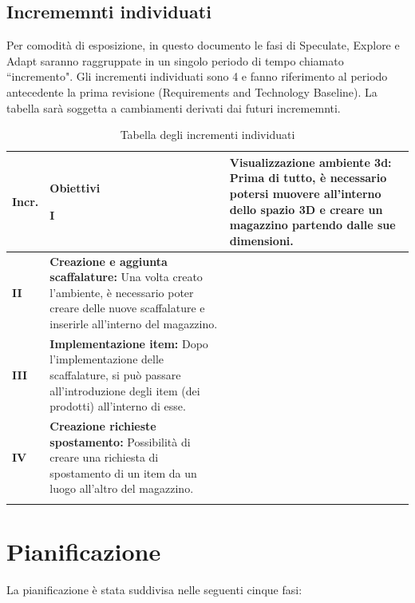 \subsection{Incrememnti individuati}\label{sec:modello_sviluppo:incrementi}
Per comodità di esposizione, in questo documento le fasi di Speculate, Explore e Adapt saranno raggruppate in un singolo periodo di tempo chiamato ``incremento".
Gli incrementi individuati sono 4 e fanno riferimento al periodo antecedente la prima revisione (Requirements and Technology Baseline).
La tabella sarà soggetta a cambiamenti derivati dai futuri incrememnti.
\begin{xltabular}{\textwidth}{p{0.05\textwidth} | p{0.5\textwidth} }

    \textbf{\color{white} Incr.} & \textbf{\color{white} Obiettivi} \ 
    \hline
    \endhead
    
    \textbf{I} 
    & \textbf{Visualizzazione ambiente 3d:} Prima di tutto, è necessario potersi muovere all'interno dello spazio 3D e creare un magazzino partendo dalle sue dimensioni. \\
    \hline

    \textbf{II} 
    & \textbf{Creazione e aggiunta scaffalature:} Una volta creato l'ambiente, è necessario poter creare delle nuove scaffalature e inserirle all'interno del magazzino. \\
    \hline

    \textbf{III} 
    & \textbf{Implementazione item:} Dopo l'implementazione delle scaffalature, si può passare all'introduzione degli item (dei prodotti) all'interno di esse. \\
    \hline

    \textbf{IV} 
    & \textbf{Creazione richieste spostamento:} Possibilità di creare una richiesta di spostamento di un item da un luogo all'altro del magazzino. \\
    \hline

\caption{Tabella degli incrementi individuati}\label{tab:incrementi}
\end{xltabular}

\newpage
\section{Pianificazione}\label{sec:pianificazione}

La pianificazione è stata suddivisa nelle seguenti cinque fasi:

